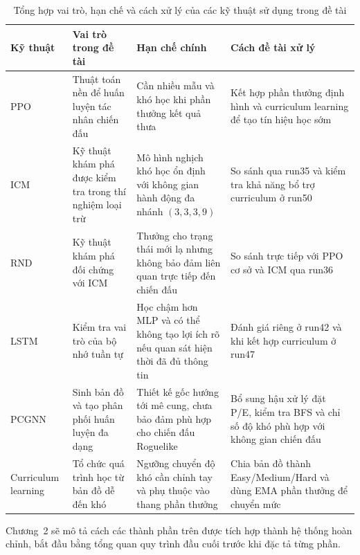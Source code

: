 \begin{table}[H]
    \centering
    \small
    \caption{Tổng hợp vai trò, hạn chế và cách xử lý của các kỹ thuật sử dụng trong đề tài}
    \label{tab:technique_summary}
    \begin{tabular}{|p{2.0cm}|p{3.0cm}|p{4.4cm}|p{4.1cm}|}
        \hline
        \textbf{Kỹ thuật} & \textbf{Vai trò trong đề tài} & \textbf{Hạn chế chính} & \textbf{Cách đề tài xử lý} \\
        \hline
        PPO & Thuật toán nền để huấn luyện tác nhân chiến đấu & Cần nhiều mẫu và khó học khi phần thưởng kết quả thưa & Kết hợp phần thưởng định hình và curriculum learning để tạo tín hiệu học sớm \\
        \hline
        ICM & Kỹ thuật khám phá được kiểm tra trong thí nghiệm loại trừ & Mô hình nghịch khó học ổn định với không gian hành động đa nhánh $(3,3,3,9)$ & So sánh qua run35 và kiểm tra khả năng bổ trợ curriculum ở run50 \\
        \hline
        RND & Kỹ thuật khám phá đối chứng với ICM & Thưởng cho trạng thái mới lạ nhưng không bảo đảm liên quan trực tiếp đến chiến đấu & So sánh trực tiếp với PPO cơ sở và ICM qua run36 \\
        \hline
        LSTM & Kiểm tra vai trò của bộ nhớ tuần tự & Học chậm hơn MLP và có thể không tạo lợi ích rõ nếu quan sát hiện thời đã đủ thông tin & Đánh giá riêng ở run42 và khi kết hợp curriculum ở run47 \\
        \hline
        PCGNN & Sinh bản đồ và tạo phân phối huấn luyện đa dạng & Thiết kế gốc hướng tới mê cung, chưa bảo đảm phù hợp cho chiến đấu Roguelike & Bổ sung hậu xử lý đặt P/E, kiểm tra BFS và chỉ số độ khó phù hợp với không gian chiến đấu \\
        \hline
        Curriculum learning & Tổ chức quá trình học từ bản đồ dễ đến khó & Ngưỡng chuyển độ khó cần chỉnh tay và phụ thuộc vào thang phần thưởng & Chia bản đồ thành Easy/Medium/Hard và dùng EMA phần thưởng để chuyển mức \\
        \hline
    \end{tabular}
\end{table}

Chương~2 sẽ mô tả cách các thành phần trên được tích hợp thành hệ thống hoàn chỉnh, bắt đầu bằng tổng quan quy trình đầu cuối trước khi đặc tả từng phần.
